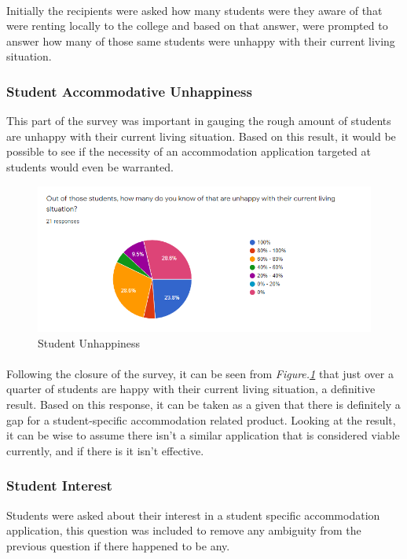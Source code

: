 \paragraph{}
Initially the recipients were asked how many students were they aware of that were renting locally to the college and based on that answer, were prompted to answer how many of those same students were unhappy with their current living situation.

\subsubsection{Student Accommodative Unhappiness}
This part of the survey was important in gauging the rough amount of students are unhappy with their current living situation. Based on this result, it would be possible to see if the necessity of an accommodation application targeted at students would even be warranted.

\begin{figure}[H]
	\caption{Student Unhappiness}
	\label{image:surveyHappy}
	\centering
	\includegraphics[width=1\textwidth]{images/survey_happy.png}
\end{figure}	

\paragraph{}
Following the closure of the survey, it can be seen from \textit{Figure.\ref{image:surveyHappy}} that just over a quarter of students are happy with their current living situation, a definitive result. Based on this response, it can be taken as a given that there is definitely a gap for a student-specific accommodation related product. Looking at the result, it can be wise to assume there isn't a similar application that is considered viable currently, and if there is it isn't effective.

\subsubsection{Student Interest}
Students were asked about their interest in a student specific accommodation application, this question was included to remove any ambiguity from the previous question if there happened to be any. 


